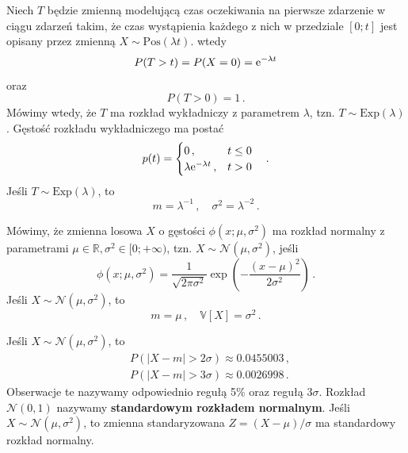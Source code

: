 \documentclass{myclass}
\numberwithin{equation}{subsection}
\begin{document}
\begin{definition}
Niech \(T\) będzie zmienną modelującą czas oczekiwania na pierwsze zdarzenie w ciągu zdarzeń takim,
że czas wystąpienia każdego z nich w przedziale \([0;t]\) jest opisany przez zmienną \(X \sim
\mathrm{Pos}(\lambda t)\). wtedy
\begin{equation*}
    P(T > t) = P(X = 0) = \mathrm{e}^{-\lambda t}
\end{equation*}
oraz
\begin{equation*}
    P(T > 0) = 1\,.
\end{equation*}
Mówimy wtedy, że \(T\) ma rozkład wykładniczy z parametrem \(\lambda\), tzn. \(T \sim
\mathrm{Exp}(\lambda)\). Gęstość rozkładu wykładniczego ma postać
\begin{equation*}
    p(t) = \begin{cases}
        0\,,&t \leq 0\\
        \lambda \mathrm{e}^{-\lambda t}\,,&t > 0
    \end{cases}\quad.
\end{equation*}
Jeśli \(T \sim \mathrm{Exp}(\lambda)\), to
\begin{equation*}
    m = \lambda^{-1}\,,\quad \sigma^2 = \lambda^{-2}\,.
\end{equation*}
\end{definition}

\begin{definition}
Mówimy, że zmienna losowa \(X\) o gęstości \(\phi(x;\mu,\sigma^2)\) ma rozkład normalny z
parametrami \(\mu \in \mathbb{R} , \sigma^2 \in [0;+\infty)\), tzn. \(X \sim
\mathcal{N}(\mu,\sigma^2)\), jeśli    
\begin{equation*}
    \phi(x; \mu, \sigma^2) = \frac{1}{\sqrt{2 \pi \sigma^2}} \exp\left(-\frac{(x-\mu)^2}{2\sigma^2}\right)\,.
\end{equation*}
Jeśli \(X \sim \mathcal{N}(\mu,\sigma^2)\), to
\begin{equation*}
    m = \mu\,,\quad \mathbb{V}[X] = \sigma^2\,.
\end{equation*}
\end{definition}

Jeśli \(X \sim \mathcal{N}(\mu,\sigma^2)\), to
\begin{equation}
    \begin{split}        
        &P(|X - m| > 2\sigma) \approx 0.0455003\,,\\
        &P(|X - m| > 3\sigma) \approx 0.0026998\,.
    \end{split}
\end{equation}
Obserwacje te nazywamy odpowiednio regułą 5\% oraz regułą \(3\sigma\). Rozkład \(\mathcal{N}(0,1)\)
nazywamy \textbf{standardowym rozkładem normalnym}. Jeśli \(X \sim \mathcal{N}(\mu,\sigma^2)\),
to zmienna standaryzowana \(Z = (X - \mu) / \sigma\) ma standardowy rozkład normalny.
\end{document}

